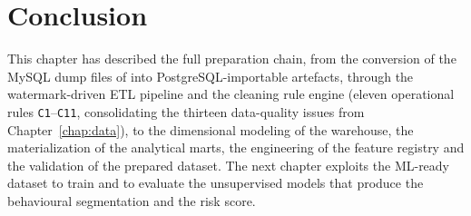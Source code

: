 \section{Conclusion}
This chapter has described the full preparation chain, from the conversion of the MySQL dump files of \hostorg{} into PostgreSQL-importable artefacts, through the watermark-driven ETL pipeline and the cleaning rule engine (eleven operational rules \texttt{C1}--\texttt{C11}, consolidating the thirteen data-quality issues from Chapter~\ref{chap:data}), to the dimensional modeling of the warehouse, the materialization of the analytical marts, the engineering of the feature registry and the validation of the prepared dataset. The next chapter exploits the ML-ready dataset to train and to evaluate the unsupervised models that produce the behavioural segmentation and the risk score.
